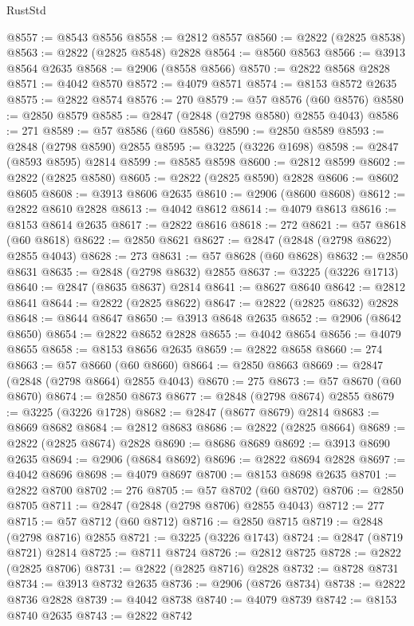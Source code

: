 \begin{lexlean}{RustStd}
\begin{coremodule}
@8557 := @8543 @8556
@8558 := @2812 @8557
@8560 := @2822 (@2825 @8538)
@8563 := @2822 (@2825 @8548) @2828
@8564 := @8560 @8563
@8566 := @3913 @8564 @2635
@8568 := @2906 (@8558 @8566)
@8570 := @2822 @8568 @2828
@8571 := @4042 @8570
@8572 := @4079 @8571
@8574 := @8153 @8572 @2635
@8575 := @2822 @8574
@8576 := 270
@8579 := @57 @8576 (@60 @8576)
@8580 := @2850 @8579
@8585 := @2847 (@2848 (@2798 @8580) @2855 @4043)
@8586 := 271
@8589 := @57 @8586 (@60 @8586)
@8590 := @2850 @8589
@8593 := @2848 (@2798 @8590) @2855
@8595 := @3225 (@3226 @1698)
@8598 := @2847 (@8593 @8595) @2814
@8599 := @8585 @8598
@8600 := @2812 @8599
@8602 := @2822 (@2825 @8580)
@8605 := @2822 (@2825 @8590) @2828
@8606 := @8602 @8605
@8608 := @3913 @8606 @2635
@8610 := @2906 (@8600 @8608)
@8612 := @2822 @8610 @2828
@8613 := @4042 @8612
@8614 := @4079 @8613
@8616 := @8153 @8614 @2635
@8617 := @2822 @8616
@8618 := 272
@8621 := @57 @8618 (@60 @8618)
@8622 := @2850 @8621
@8627 := @2847 (@2848 (@2798 @8622) @2855 @4043)
@8628 := 273
@8631 := @57 @8628 (@60 @8628)
@8632 := @2850 @8631
@8635 := @2848 (@2798 @8632) @2855
@8637 := @3225 (@3226 @1713)
@8640 := @2847 (@8635 @8637) @2814
@8641 := @8627 @8640
@8642 := @2812 @8641
@8644 := @2822 (@2825 @8622)
@8647 := @2822 (@2825 @8632) @2828
@8648 := @8644 @8647
@8650 := @3913 @8648 @2635
@8652 := @2906 (@8642 @8650)
@8654 := @2822 @8652 @2828
@8655 := @4042 @8654
@8656 := @4079 @8655
@8658 := @8153 @8656 @2635
@8659 := @2822 @8658
@8660 := 274
@8663 := @57 @8660 (@60 @8660)
@8664 := @2850 @8663
@8669 := @2847 (@2848 (@2798 @8664) @2855 @4043)
@8670 := 275
@8673 := @57 @8670 (@60 @8670)
@8674 := @2850 @8673
@8677 := @2848 (@2798 @8674) @2855
@8679 := @3225 (@3226 @1728)
@8682 := @2847 (@8677 @8679) @2814
@8683 := @8669 @8682
@8684 := @2812 @8683
@8686 := @2822 (@2825 @8664)
@8689 := @2822 (@2825 @8674) @2828
@8690 := @8686 @8689
@8692 := @3913 @8690 @2635
@8694 := @2906 (@8684 @8692)
@8696 := @2822 @8694 @2828
@8697 := @4042 @8696
@8698 := @4079 @8697
@8700 := @8153 @8698 @2635
@8701 := @2822 @8700
@8702 := 276
@8705 := @57 @8702 (@60 @8702)
@8706 := @2850 @8705
@8711 := @2847 (@2848 (@2798 @8706) @2855 @4043)
@8712 := 277
@8715 := @57 @8712 (@60 @8712)
@8716 := @2850 @8715
@8719 := @2848 (@2798 @8716) @2855
@8721 := @3225 (@3226 @1743)
@8724 := @2847 (@8719 @8721) @2814
@8725 := @8711 @8724
@8726 := @2812 @8725
@8728 := @2822 (@2825 @8706)
@8731 := @2822 (@2825 @8716) @2828
@8732 := @8728 @8731
@8734 := @3913 @8732 @2635
@8736 := @2906 (@8726 @8734)
@8738 := @2822 @8736 @2828
@8739 := @4042 @8738
@8740 := @4079 @8739
@8742 := @8153 @8740 @2635
@8743 := @2822 @8742

\end{coremodule}
\end{lexlean}
